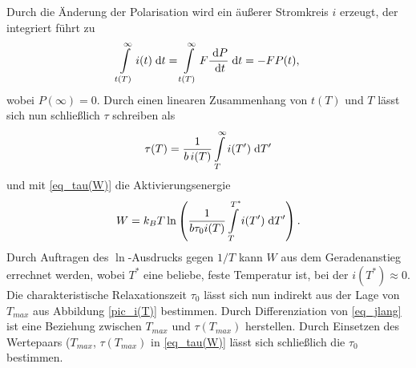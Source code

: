 Durch die Änderung der Polarisation wird ein äußerer Stromkreis $i$ erzeugt, der integriert führt zu
\begin{align}
 \int\limits_{t(T)}^\infty i(t)\; \mathrm{d} t = \int\limits_{t(T)}^\infty F\frac{\; \mathrm{d} P}{\; \mathrm{d} t}\; \mathrm{d} t = -FP(t),
\end{align}
wobei $P(\infty) = 0$. Durch einen linearen Zusammenhang von $t(T)$ und $T$ lässt sich nun schließlich $\tau$ schreiben als
\begin{align}
 \tau(T) = \frac{1}{b\,i(T)}\int\limits_T^\infty i(T')\; \mathrm{d} T'
\end{align}
und mit \eqref{eq_tau(W)} die Aktivierungsenergie
\begin{align}
 W = k_BT \ln\left(\frac{1}{b\tau_0 i(T)}\int\limits_T^{T^*} i(T')\; \mathrm{d} T'\right).
 \label{eq_int}
\end{align}
Durch Auftragen des $\ln$-Ausdrucks gegen $1/T$ kann $W$ aus dem Geradenanstieg errechnet werden, wobei $T^*$ eine beliebe, feste Temperatur ist,
bei der $i(T^*)\approx 0$. Die charakteristische Relaxationszeit $\tau_0$ lässt sich nun indirekt aus der Lage von $T_{max}$ aus Abbildung \ref{pic_i(T)} bestimmen. Durch Differenziation
von \eqref{eq_jlang} ist eine Beziehung zwischen $T_{max}$ und $\tau(T_{max})$ herstellen. Durch Einsetzen des Wertepaars ($T_{max}$, $\tau(T_{max})$
in \eqref{eq_tau(W)} lässt sich schließlich die $\tau_0$ bestimmen.

